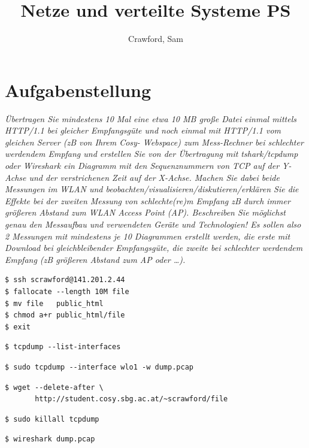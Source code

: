 \documentclass[
    pdftex,
    12pt,
    parskip=half,
    a4paper
]{scrartcl}
\author{Crawford, Sam}
\title{Netze und verteilte Systeme PS}
\begin{document}
\section{Aufgabenstellung}
\textit{Übertragen Sie mindestens 10 Mal eine etwa 10 MB große Datei einmal mittels HTTP/1.1 bei
gleicher Empfangsgüte und noch einmal mit HTTP/1.1 vom gleichen Server (zB von Ihrem Cosy-
Webspace) zum Mess-Rechner bei schlechter werdendem Empfang und erstellen Sie von der
Übertragung mit tshark/tcpdump oder Wireshark ein Diagramm mit den Sequenznummern von TCP
auf der Y-Achse und der verstrichenen Zeit auf der X-Achse. Machen Sie dabei beide Messungen
im WLAN und beobachten/visualisieren/diskutieren/erklären Sie die Effekte bei der zweiten
Messung von schlechte(re)m Empfang zB durch immer größeren Abstand zum WLAN Access Point
(AP).
Beschreiben Sie möglichst genau den Messaufbau und verwendeten Geräte und Technologien!
Es sollen also 2 Messungen mit mindestens je 10 Diagrammen erstellt werden, die erste mit
Download bei gleichbleibender Empfangsgüte, die zweite bei schlechter werdendem Empfang (zB
größeren Abstand zum AP oder …).}

\vspace{3cm}%

\begin{lstlisting}
$ ssh scrawford@141.201.2.44
$ fallocate --length 10M file
$ mv file	public_html
$ chmod a+r public_html/file
$ exit
\end{lstlisting}

\vspace{2cm}%
\begin{lstlisting}
$ tcpdump --list-interfaces
\end{lstlisting}
\vspace{2cm}%

\begin{lstlisting}
$ sudo tcpdump --interface wlo1 -w dump.pcap
\end{lstlisting}
\vspace{2cm}%
\begin{lstlisting}
$ wget --delete-after \
       http://student.cosy.sbg.ac.at/~scrawford/file
\end{lstlisting}
\vspace{2cm}%
\begin{lstlisting}
$ sudo killall tcpdump 
\end{lstlisting}

\vspace{2cm}%
\begin{lstlisting}
$ wireshark dump.pcap
\end{lstlisting}
\vspace{4cm}%
\end{document}
